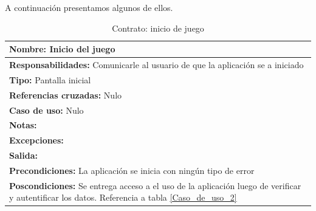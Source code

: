 A continuación presentamos algunos de ellos.

\begin{table}[H]
    \begin{center}
        \begin{tabular}{| m{15cm} |}       
        	\hline 
        	\textbf{Nombre:} Inicio del juego \\
        	\hline
        	\textbf{Responsabilidades:} Comunicarle al usuario de que la aplicación se a iniciado\\
        	\hline
        	\textbf{Tipo:} Pantalla inicial \\
        	\hline
        	\textbf{Referencias cruzadas:} Nulo\\
        	\hline
        	\textbf{Caso de uso:} Nulo\\
        	\hline
        	\textbf{Notas:} \\
        	\hline
        	\textbf{Excepciones:} \\
        	\hline
        	\textbf{Salida:} \\
        	\hline
        	\textbf{Precondiciones:} La aplicación se inicia con ningún tipo de error\\
        	\hline
        	\textbf{Poscondiciones:} Se entrega acceso a el uso de la aplicación luego de verificar y autentificar los datos. Referencia a tabla \ref{Caso_de_uso_2}\\
        	\hline
        \end{tabular}
	\caption{Contrato: inicio de juego}
    \label{Contrato1}
    \end{center}
\end{table}

